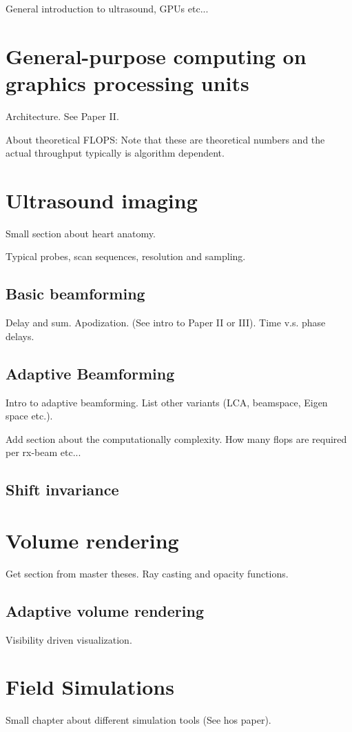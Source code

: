 %

General introduction to ultrasound, GPUs etc...

\section{General-purpose computing on graphics processing units}

Architecture. See Paper II.

About theoretical FLOPS: Note that these are theoretical numbers and the actual throughput typically is algorithm dependent.

\section {Ultrasound imaging}

Small section about heart anatomy.

Typical probes, scan sequences, resolution and sampling.
							
\subsection{Basic beamforming}

Delay and sum. Apodization. (See intro to Paper II or III).
Time v.s. phase delays.

\subsection{Adaptive Beamforming}\label{sec:adaptbf}

Intro to adaptive beamforming. List other variants (LCA, beamspace, Eigen space etc.). 

Add section about the computationally complexity. How many flops are required per rx-beam etc...
						
\subsection{Shift invariance}

\section{Volume rendering}

Get section from master theses. Ray casting and opacity functions.

\subsection{Adaptive volume rendering}

Visibility driven visualization.

\section{Field Simulations}

Small chapter about different simulation tools (See hos paper).
			
\endinput
